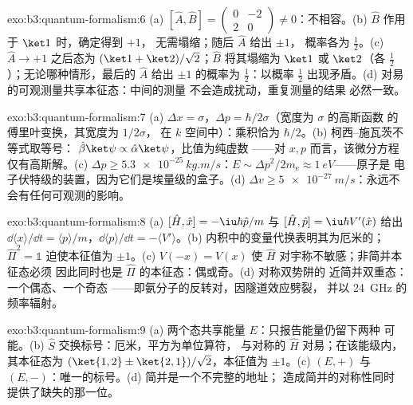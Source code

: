 \begin{solution}{exo:b3:quantum-formalism:6}
(a) $[\hat A, \hat B] = \begin{pmatrix}0 & -2\\ 2 & 0\end{pmatrix}
\neq 0$：不相容。(b) $\hat B$ 作用于 $\ket1$ 时，确定得到 $+1$，
无需塌缩；随后 $\hat A$ 给出 $\pm1$，
概率各为 $\tfrac12$。(c) $\hat A \to +1$ 之后态为
$(\ket1 + \ket2)/\sqrt2$；$\hat B$ 将其塌缩为 $\ket1$ 或
$\ket2$（各 $\tfrac12$）；无论哪种情形，最后的 $\hat A$ 给出
$\pm1$ 的概率为 $\tfrac12$：以概率
$\tfrac12$ 出现矛盾。(d) 对易的可观测量共享本征态：中间的测量
不会造成扰动，重复测量的结果
必然一致。
\end{solution}

\begin{solution}{exo:b3:quantum-formalism:7}
(a) $\Delta x = \sigma$，$\Delta p = \hbar/2\sigma$（宽度为 $\sigma$ 的高斯函数
的傅里叶变换，其宽度为 $1/2\sigma$，
在 $k$ 空间中）：乘积恰为 $\hbar/2$。(b) 柯西–施瓦茨不等式取等号：
$\hat\beta\ket\psi \propto \hat\alpha\ket\psi$，比值为纯虚数
——对 $x, p$ 而言，该微分方程
仅有高斯解。(c) $\Delta p \ge \qty{5.3e-25}{kg.m/s}$：$E \sim
\Delta p^2/2m_{\text{e}} \approx \qty{1}{eV}$——原子是
电子伏特级的装置，因为它们是埃量级的盒子。(d)
$\Delta v \ge \qty{5e-27}{m/s}$：永远不会有任何可观测的影响。
\end{solution}

\begin{solution}{exo:b3:quantum-formalism:8}
(a) $[\hat H, \hat x] = -\iu\hbar\hat p/m$ 与 $[\hat H, \hat p] =
\iu\hbar V'(\hat x)$ 给出 $\dd\langle x\rangle/\dd t = \langle
p\rangle/m$，$\dd\langle p\rangle/\dd t = -\langle V'\rangle$。(b)
内积中的变量代换表明其为厄米的；
$\hat\Pi^2 = \mathbb 1$ 迫使本征值为 $\pm1$。(c) $V(-x) =
V(x)$ 使 $\hat H$ 对宇称不敏感；非简并本征态必须
因此同时也是 $\hat\Pi$ 的本征态：偶或奇。(d) 对称双势阱的
近简并双重态：一个偶态、一个奇态
——即氨分子的反转对，因隧道效应劈裂，
并以 \qty{24}{GHz} 的频率辐射。
\end{solution}

\begin{solution}{exo:b3:quantum-formalism:9}
(a) 两个态共享能量 $E$：只报告能量仍留下两种
可能。(b) $\hat S$ 交换标号：厄米，平方为单位算符，
与对称的 $\hat H$ 对易；在该能级内，其本征态为
$(\ket{1,2} \pm \ket{2,1})/\sqrt2$，本征值为
$\pm1$。(c) $(E, +)$ 与 $(E, -)$：唯一的标号。(d) 简并是一个不完整的地址；
造成简并的对称性同时
提供了缺失的那一位。
\end{solution}

